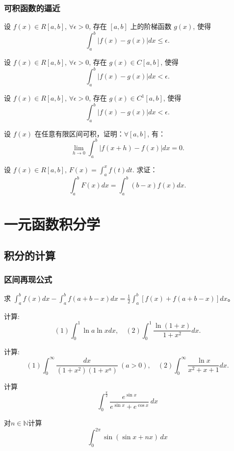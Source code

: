 \documentclass[lang=cn,10pt,thmcnt=section]{elegantbook}
\begin{document}
\subsection{可积函数的逼近}
\begin{example}[阶梯逼近]
	设 \( f(x) \in R[a,b] \), \(\forall \epsilon > 0\), 存在 \([a,b]\) 上的阶梯函数 \( g(x) \), 使得 
\[ \int_{a}^{b} |f(x)-g(x)|dx \leq \epsilon. \]
\end{example}
\begin{example}[连续逼近]
	设 \( f(x) \in R[a,b] \), \(\forall \epsilon > 0\), 存在 \( g(x) \in C[a,b] \), 使得 
\[ \int_{a}^{b} |f(x)-g(x)|dx < \epsilon. \]
\end{example}
\begin{example}[可微逼近]
	设 \( f(x) \in R[a,b] \), \(\forall \epsilon > 0\), 存在 \( g(x) \in C^{1}[a,b] \), 使得 
\[ \int_{a}^{b} |f(x)-g(x)|dx < \epsilon. \]
\end{example}
\begin{example}[绝对连续性]
	设 \( f(x) \) 在任意有限区间可积，证明：\(\forall [a,b]\), 有：
\[ \lim_{h \to 0} \int_{a}^{b} |f(x+h)-f(x)|dx = 0. \]
\end{example}
\begin{example}
	设 \( f(x) \in R[a,b] \), \( F(x) = \int_{a}^{x} f(t)dt \). 求证：
\[ \int_{a}^{b} F(x)dx = \int_{a}^{b} (b-x)f(x)dx. \]
\end{example}

\chapter{一元函数积分学}
\section{积分的计算}
\subsection{区间再现公式}
\begin{example}[区间再现公式]
	求 \( \int_{a}^{b} f(x) dx - \int_{a}^{b} f(a+b-x) dx = \frac{1}{2} \int_{a}^{b} [f(x)+f(a+b-x)] dx \)。
	\end{example}
	
	\begin{example}
	计算:
	\[(1) \int_{0}^{1} \ln a \ln x dx, \quad (2) \int_{0}^{1} \frac{\ln(1+x)}{1+x^2} dx.\]
	\end{example}
	
\begin{example}
	计算:
	\[(1) \int_{0}^{\infty} \frac{dx}{(1+x^2)(1+x^a)} \ (a>0), \quad (2) \int_{0}^{\infty} \frac{\ln x}{x^2 + x + 1 }dx.\]
\end{example}
\begin{example}
	计算
	\[\int_{0}^{\frac{\pi}{2}}\frac{e^{\sin x}}{e^{\sin x}+e^{\cos x}}  \,dx 
	\]
\end{example}
\begin{example}
	对$n\in\mathbb{N} $计算
	\[\int_{0}^{2\pi}  \sin(\sin x+nx )\,dx 
	\]
\end{example}
\end{document}
